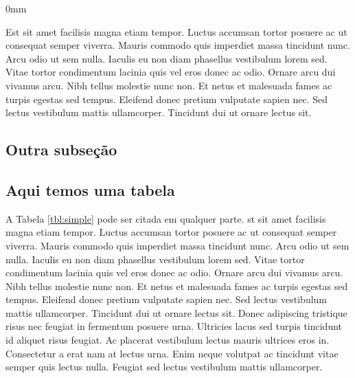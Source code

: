 \documentclass[./main.tex]{subfiles}
\begin{document}
\begin{adjustwidth}{\bodytab}{0mm}

\par Est sit amet facilisis magna etiam tempor. Luctus accumsan tortor posuere ac ut consequat semper viverra. Mauris commodo quis imperdiet massa tincidunt nunc. Arcu odio ut sem nulla. Iaculis eu non diam phasellus vestibulum lorem sed. Vitae tortor condimentum lacinia quis vel eros donec ac odio. Ornare arcu dui vivamus arcu. Nibh tellus molestie nunc non. Et netus et malesuada fames ac turpis egestas sed tempus. Eleifend donec pretium vulputate sapien nec. Sed lectus vestibulum mattis ullamcorper. Tincidunt dui ut ornare lectus sit.

\subsection{Outra subseção} \label{chp1:sec2:sub1}

\blindtext[3]

\subsection{Aqui temos uma tabela}  \label{chp1:sec2:sub2}

\par A Tabela \ref{tbl:simple} pode ser citada em qualquer parte. st sit amet facilisis magna etiam tempor. Luctus accumsan tortor posuere ac ut consequat semper viverra. Mauris commodo quis imperdiet massa tincidunt nunc. Arcu odio ut sem nulla. Iaculis eu non diam phasellus vestibulum lorem sed. Vitae tortor condimentum lacinia quis vel eros donec ac odio. Ornare arcu dui vivamus arcu. Nibh tellus molestie nunc non. Et netus et malesuada fames ac turpis egestas sed tempus. Eleifend donec pretium vulputate sapien nec. Sed lectus vestibulum mattis ullamcorper. Tincidunt dui ut ornare lectus sit. Donec adipiscing tristique risus nec feugiat in fermentum posuere urna. Ultricies lacus sed turpis tincidunt id aliquet risus feugiat. Ac placerat vestibulum lectus mauris ultrices eros in. Consectetur a erat nam at lectus urna. Enim neque volutpat ac tincidunt vitae semper quis lectus nulla. Feugiat sed lectus vestibulum mattis ullamcorper.


\end{adjustwidth}
\end{document}
